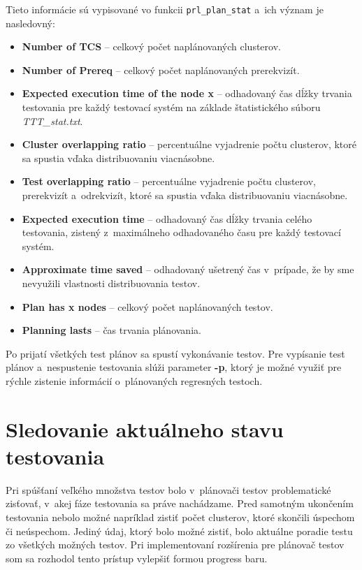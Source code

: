 \noindent Tieto informácie sú vypisované vo funkcii \texttt{prl\_plan\_stat} 
a~ich význam je nasledovný:
\begin{itemize}
\item \textbf{Number of TCS} -- celkový počet naplánovaných clusterov.
\item \textbf{Number of Prereq} -- celkový počet naplánovaných prerekvizít.
\item \textbf{Expected execution time of the node x} -- odhadovaný čas dĺžky
trvania testovania pre každý testovací systém na 
základe štatistického súboru \textit{TTT\_stat.txt}.
\item \textbf{Cluster overlapping ratio} -- percentuálne vyjadrenie počtu
clusterov, ktoré sa spustia vďaka distribuovaniu viacnásobne. 
\item \textbf{Test overlapping ratio} -- percentuálne vyjadrenie počtu
clusterov, prerekvizít a~odrekvizít, ktoré sa spustia vďaka 
distribuovaniu viacnásobne.
\item \textbf{Expected execution time} -- odhadovaný čas dĺžky
trvania celého testovania, zistený z~maximálneho odhadovaného času pre
každý testovací systém.
\item \textbf{Approximate time saved} -- odhadovaný ušetrený čas v~prípade,
že by sme nevyužili vlastnosti distribuovania testov.
\item \textbf{Plan has x nodes} -- celkový počet naplánovaných testov.
\item \textbf{Planning lasts} -- čas trvania plánovania.
\end{itemize}

Po prijatí všetkých test plánov sa spustí vykonávanie testov. 
Pre vypísanie test plánov a~nespustenie testovania slúži parameter 
\textbf{-p}, ktorý je možné využiť pre rýchle zistenie informácií 
o~plánovaných regresných testoch.


\section{Sledovanie aktuálneho stavu testovania}
\label{sekcia:sledovanie_stavu}
Pri spúšťaní veľkého množstva testov bolo v~plánovači testov problematické
zisťovať, v~akej fáze testovania sa práve nachádzame. 
Pred samotným ukončením testovania nebolo možné napríklad zistiť počet 
clusterov, ktoré skončili úspechom či neúspechom. 
Jediný údaj, ktorý bolo možné zistiť, bolo aktuálne poradie testu
zo všetkých možných testov.
Pri implementovaní rozšírenia pre plánovač testov som sa rozhodol tento
prístup vylepšiť formou progress baru.

